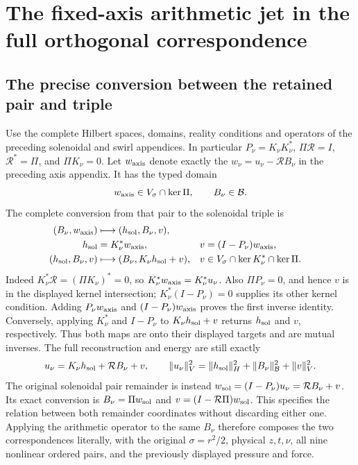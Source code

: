 \section*{The fixed-axis arithmetic jet in the full orthogonal correspondence}

\subsection*{The precise conversion between the retained pair and triple}

Use the complete Hilbert spaces, domains, reality conditions and operators
of the preceding solenoidal and swirl appendices. In particular
\(P_\nu=K_\nu K_\nu^*\), \(\Pi\mathcal R=I\),
\(\mathcal R^*=\Pi\), and \(\Pi K_\nu=0\).
Let \(w_{\rm axis}\) denote exactly the \(w_\nu=u_\nu-\mathcal R B_\nu\)
in the preceding axis appendix. It has the typed domain
\[
 w_{\rm axis}\in V_\sigma\cap\ker\Pi,
 \qquad B_\nu\in\mathcal B.
\]
The complete conversion from that pair to the solenoidal triple is
\begin{align*}
 (B_\nu,w_{\rm axis})&\longmapsto
   (h_{\rm sol},B_\nu,v),\\
 h_{\rm sol}&=K_\nu^*w_{\rm axis},
 &v&=(I-P_\nu)w_{\rm axis},\\
 (h_{\rm sol},B_\nu,v)&\longmapsto
   (B_\nu,K_\nu h_{\rm sol}+v),
 &v&\in V_\sigma\cap\ker K_\nu^*\cap\ker\Pi.
\end{align*}
Indeed \(K_\nu^*\mathcal R=(\Pi K_\nu)^*=0\), so
\(K_\nu^*w_{\rm axis}=K_\nu^*u_\nu\).
Also \(\Pi P_\nu=0\), and hence \(v\) is in the displayed kernel
intersection; \(K_\nu^*(I-P_\nu)=0\) supplies its other kernel condition.
Adding \(P_\nu w_{\rm axis}\) and \((I-P_\nu)w_{\rm axis}\)
proves the first inverse identity. Conversely, applying \(K_\nu^*\)
and \(I-P_\nu\) to \(K_\nu h_{\rm sol}+v\) returns
\(h_{\rm sol}\) and \(v\), respectively. Thus both maps are onto their
displayed targets and are mutual inverses. The full reconstruction and
energy are still exactly
\[
 u_\nu=K_\nu h_{\rm sol}+\mathcal R B_\nu+v,
 \qquad
 \|u_\nu\|_V^2=
 \|h_{\rm sol}\|_H^2+\|B_\nu\|_{\mathcal B}^2+\|v\|_V^2.
\]
The original solenoidal pair remainder is instead
\(w_{\rm sol}=(I-P_\nu)u_\nu=\mathcal R B_\nu+v\).
Its exact conversion is \(B_\nu=\Pi w_{\rm sol}\) and
\(v=(I-\mathcal R\Pi)w_{\rm sol}\).
This specifies the relation between both remainder coordinates without
discarding either one. Applying the arithmetic operator to the same
\(B_\nu\) therefore composes the two correspondences literally, with
the original \(\sigma=r^2/2\), physical \(z,t,\nu\), all nine
nonlinear ordered pairs, and the previously displayed pressure and force.


